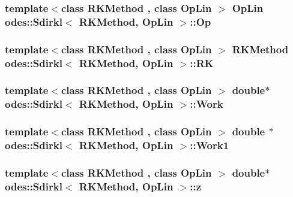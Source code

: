 \hypertarget{classodes_1_1Sdirkl_a9e090146baaa9e9e3ffabc92a07c101e}{
\subsubsection[{Op}]{\setlength{\rightskip}{0pt plus 5cm}template$<$class R\-K\-Method , class Op\-Lin $>$ Op\-Lin {\bf odes\-::\-Sdirkl}$<$ R\-K\-Method, Op\-Lin $>$\-::Op\hspace{0.3cm}{\ttfamily [private]}}}\label{classodes_1_1Sdirkl_a9e090146baaa9e9e3ffabc92a07c101e}
\hypertarget{classodes_1_1Sdirkl_a9dd62d6ca502cee8b06adc8b9de59fb6}{
\subsubsection[{R\-K}]{\setlength{\rightskip}{0pt plus 5cm}template$<$class R\-K\-Method , class Op\-Lin $>$ R\-K\-Method {\bf odes\-::\-Sdirkl}$<$ R\-K\-Method, Op\-Lin $>$\-::R\-K\hspace{0.3cm}{\ttfamily [private]}}}\label{classodes_1_1Sdirkl_a9dd62d6ca502cee8b06adc8b9de59fb6}
\hypertarget{classodes_1_1Sdirkl_abc65439561d1950d191452b9b467f29d}{
\subsubsection[{Work}]{\setlength{\rightskip}{0pt plus 5cm}template$<$class R\-K\-Method , class Op\-Lin $>$ double$\ast$ {\bf odes\-::\-Sdirkl}$<$ R\-K\-Method, Op\-Lin $>$\-::Work\hspace{0.3cm}{\ttfamily [private]}}}\label{classodes_1_1Sdirkl_abc65439561d1950d191452b9b467f29d}
\hypertarget{classodes_1_1Sdirkl_ae3e0f5990ecdcb1b9d5e5c6cf2cd0da0}{
\subsubsection[{Work1}]{\setlength{\rightskip}{0pt plus 5cm}template$<$class R\-K\-Method , class Op\-Lin $>$ double $\ast$ {\bf odes\-::\-Sdirkl}$<$ R\-K\-Method, Op\-Lin $>$\-::Work1\hspace{0.3cm}{\ttfamily [private]}}}\label{classodes_1_1Sdirkl_ae3e0f5990ecdcb1b9d5e5c6cf2cd0da0}
\hypertarget{classodes_1_1Sdirkl_aa4de1776bba3e4dce817fc7fdb6067ac}{
\subsubsection[{z}]{\setlength{\rightskip}{0pt plus 5cm}template$<$class R\-K\-Method , class Op\-Lin $>$ double$\ast$ {\bf odes\-::\-Sdirkl}$<$ R\-K\-Method, Op\-Lin $>$\-::z\hspace{0.3cm}{\ttfamily [private]}}}\label{classodes_1_1Sdirkl_aa4de1776bba3e4dce817fc7fdb6067ac}


